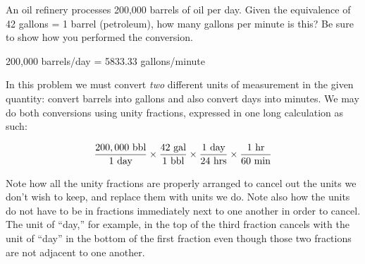 

An oil refinery processes 200,000 barrels of oil per day.  Given the equivalence of 42 gallons = 1 barrel (petroleum), how many gallons per minute is this?  Be sure to show how you performed the conversion.  







200,000 barrels/day = 5833.33 gallons/minute

\vskip 10pt

In this problem we must convert {\it two} different units of measurement in the given quantity: convert barrels into gallons and also convert days into minutes.  We may do both conversions using unity fractions, expressed in one long calculation as such:

$${200,000 \hbox{ bbl} \over 1 \hbox{ day}} \times {42 \hbox{ gal} \over 1 \hbox{ bbl}} \times {1 \hbox{ day} \over 24 \hbox{ hrs}} \times {1 \hbox{ hr} \over 60 \hbox{ min}}$$

Note how all the unity fractions are properly arranged to cancel out the units we don't wish to keep, and replace them with units we do.  Note also how the units do not have to be in fractions immediately next to one another in order to cancel.  The unit of ``day,'' for example, in the top of the third fraction cancels with the unit of ``day'' in the bottom of the first fraction even though those two fractions are not adjacent to one another.











